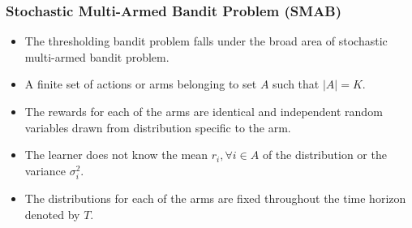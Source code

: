\begin{frame}
\frametitle{Stochastic Multi-Armed Bandit Problem (SMAB)}
\begin{itemize}
\item<1-> The thresholding bandit problem falls under the broad area of stochastic multi-armed bandit problem.
\item<2-> A finite set of actions or arms belonging to set $A$ such that $|A|=K$. 
\item<3-> The rewards for each of the arms are identical and independent random variables drawn from distribution specific to the arm.
\item<4-> The learner does not know the mean $r_{i},\forall i\in A$ of the distribution or the variance $\sigma_i^2$. 
\item<5-> The distributions for each of the arms are fixed throughout the time horizon denoted by $T$. 
\end{itemize}
\end{frame}


